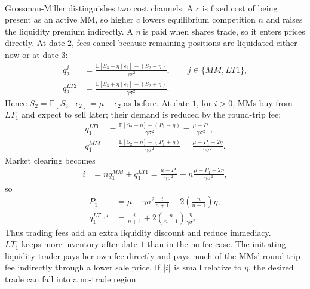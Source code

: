 \begin{model}
\par\smallskip\noindent{}\\
Grossman-Miller distinguishes two cost channels. A  $c$ is fixed cost of being present as an active MM, so higher $c$ lowers equilibrium competition $n$ and raises the liquidity premium indirectly. A  $\eta$ is paid when shares trade, so it enters prices directly. At date $2$, fees cancel because remaining positions are liquidated either now or at date $3$:
\begin{align*}
q_2^j
&=\frac{\mathbb{E}[S_3-\eta\mid\epsilon_2]-(S_2-\eta)}{\gamma\sigma^2},
\qquad j\in\{MM,LT1\},\\
q_2^{LT2}
&=\frac{\mathbb{E}[S_3+\eta\mid\epsilon_2]-(S_2+\eta)}{\gamma\sigma^2}.
\end{align*}
Hence $S_2=\mathbb{E}[S_3\mid\epsilon_2]=\mu+\epsilon_2$ as before. At date $1$, for $i>0$, MMs buy from $LT_1$ and expect to sell later; their demand is reduced by the round-trip fee:
\begin{align*}
q_1^{LT1}
&=\frac{\mathbb{E}[S_2-\eta]-(P_1-\eta)}{\gamma\sigma^2}
=\frac{\mu-P_1}{\gamma\sigma^2},\\
q_1^{MM}
&=\frac{\mathbb{E}[S_2-\eta]-(P_1+\eta)}{\gamma\sigma^2}
=\frac{\mu-P_1-2\eta}{\gamma\sigma^2}.
\end{align*}
Market clearing becomes
\begin{align*}
i&=nq_1^{MM}+q_1^{LT1}
=\frac{\mu-P_1}{\gamma\sigma^2}
+n\frac{\mu-P_1-2\eta}{\gamma\sigma^2},
\end{align*}
so
\begin{align*}
P_1&=\mu-\gamma\sigma^2\frac{i}{n+1}-2\left(\frac{n}{n+1}\right)\eta,\\
q_1^{LT1,\star}
&=\frac{i}{n+1}+2\left(\frac{n}{n+1}\right)\frac{\eta}{\gamma\sigma^2}.
\end{align*}
Thus trading fees add an extra liquidity discount and reduce immediacy.\\
$LT_1$ keeps more inventory after date $1$ than in the no-fee case. The initiating liquidity trader pays her own fee directly and pays much of the MMs' round-trip fee indirectly through a lower sale price. If $\left\lvert i\right\rvert$ is small relative to $\eta$, the desired trade can fall into a no-trade region.


\end{model}
